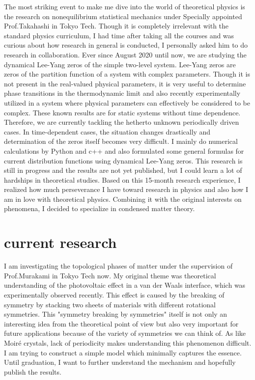 \documentclass[a4]{article}
\begin{document}
The most striking event to make me dive into the world of theoretical physics is the research on nonequilibrium statistical mechanics under Specially appointed Prof.Takahashi in Tokyo Tech. Though it is completely irrelevant with the standard physics curriculum, I had time after taking all the courses and was curious about how research in general is conducted, I personally asked him to do research in collaboration. Ever since August 2020 until now, we are studying the dynamical Lee-Yang zeros of the simple two-level system. Lee-Yang zeros are zeros of the partition function of a system with complex parameters. Though it is not present in the real-valued physical parameters, it is very useful to determine phase transitions in the thermodynamic limit and also recently experimentally utilized in a system where physical parameters can effectively be considered to be complex. These known results are for static systems without time dependence. Therefore, we are currently tackling the hetherto unknown periodically driven cases. In time-dependent cases, the situation changes drastically and determination of the zeros itself becomes very difficult. I mainly do numerical calculations by Python and c++ and also formulated some general formulas for current distribution functions using dynamical Lee-Yang zeros. This research is still in progress and the results are not yet published, but I could learn a lot of hardships in theoretical studies. Based on this 15-month research experience, I realized how much  perseverance I have toward research in physics and also how I am in love with theoretical physics. Combining it with the original interests on phenomena, I decided to specialize in condensed matter theory.\par

\section{current research}
I am investigating the topological phases of matter under the supervision of Prof.Murakami in Tokyo Tech now. My original theme was theoretical understanding of the photovoltaic effect in a van der Waals interface, which was experimentally observed recently. This effect is caused by the breaking of symmetry by stacking two sheets of materials with different rotational symmetries. This "symmetry breaking by symmetries" itself is not only an interesting idea from the theoretical point of view but also very important for future applications because of the variety of symmetries we can think of.  As like Moir\'{e} crystals, lack of periodicity makes understanding this phenomenon difficult. I am trying to construct a simple model which minimally captures the essence. Until graduation, I want to further understand the mechanism and hopefully publish the results. \par
\end{document}
